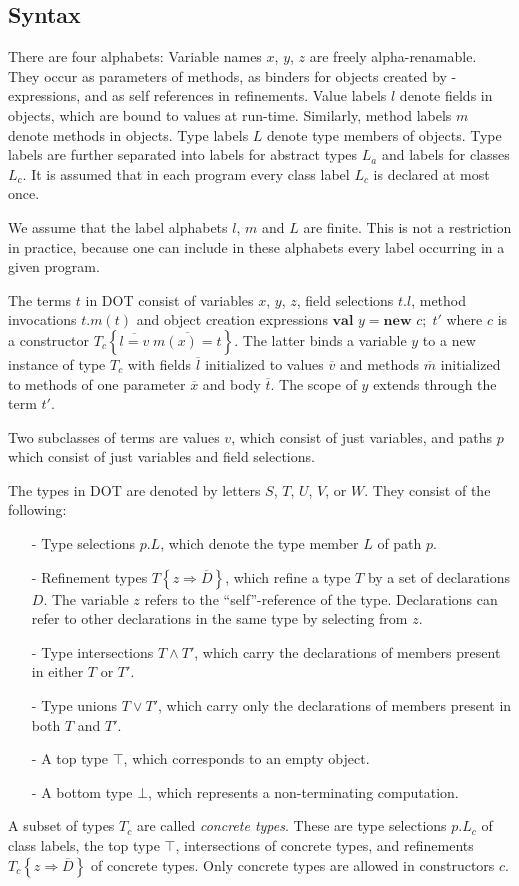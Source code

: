 \documentclass[9pt]{sigplanconf}
\newcommand{\tand}{\wedge}
\newcommand{\tor}{\vee}
\newcommand{\refine}[2]{\left\{#1 \Rightarrow #2 \right\}}
\newcommand{\ldefs}[1]{\left\{#1\right\}}
\newcommand{\seq}[1]{\overline{#1}}
\newcommand{\new}[3]{\textbf{val }#1 = \textbf{new }#2 ;\; #3}
\newcommand{\Top}{\top}%
\newcommand{\Bot}{\bot}%
\begin{document}
\subsection{Syntax}

There are four alphabets: Variable names $x$, $y$, $z$ are freely
alpha-renamable. They occur as parameters of methods, as
binders for objects created by \verb@new@-expressions, and as self
references in refinements. Value labels $l$ denote fields in objects,
which are bound to values at run-time. Similarly, method labels $m$
denote methods in objects. Type labels $L$ denote type members of
objects. Type labels are further separated into labels for abstract
types $L_a$ and labels for classes $L_c$. It is assumed that in each
program every class label $L_c$ is declared at most once.

We assume that the label alphabets $l$, $m$ and $L$ are finite. This is
not a restriction in practice, because one can include in these 
alphabets every label occurring in a given program.

The terms $t$ in DOT consist of variables $x$, $y$, $z$, field
selections $t.l$, method invocations $t.m(t)$ and object creation
expressions $\new y c {t'}$ where $c$ is a constructor $T_c \ldefs{\seq{l
    = v}\;\seq{m(x) = t}}$. The latter binds a variable $y$ to a new
instance of type $T_c$ with fields $\seq l$ initialized to values
$\seq v$ and methods $\seq m$ initialized to methods of one parameter
$\seq{x}$ and body $\seq{t}$.  The scope of $y$ extends through the term
${t'}$.

Two subclasses of terms are values $v$, which consist of just
variables, and paths $p$ which consist of just variables and field
selections.

The types in DOT are denoted by letters $S$, $T$, $U$, $V$, or $W$. They consist of the following:
\begin{itemize}
\item[-] Type selections $p.L$, which denote the type member $L$ of path $p$.
\item[-] Refinement types $T \refine z {\seq D}$, which refine a type $T$ by a set of declarations $D$.
         The variable $z$ refers to the ``self''-reference of the type. Declarations can refer to
         other declarations in the same type by selecting from $z$.
\item[-] Type intersections $T \tand T'$, which carry the declarations of members present in either $T$ or $T'$.
\item[-] Type unions $T \tor T'$, which carry only the declarations of members present in both $T$ and $T'$.
\item[-] A top type $\Top$, which corresponds to an empty object.
\item[-] A bottom type $\Bot$, which represents a non-terminating computation.
\end{itemize}
A subset of types $T_c$ are called {\em concrete types}. These are type selections
$p.L_c$ of class labels,
the top type $\Top$, intersections of concrete types, and refinements $T_c \refine z {\seq D}$ of concrete types. Only concrete types are allowed in constructors $c$.
\end{document}
